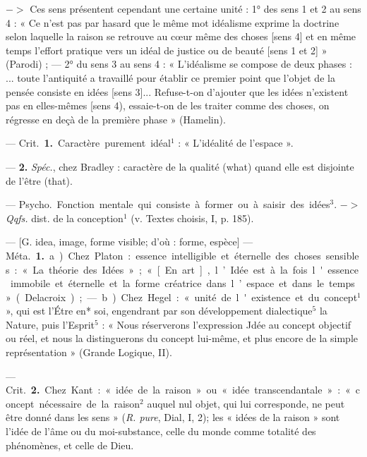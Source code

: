 \begin{itemize}[leftmargin=1cm, label=, itemsep=1pt]
$->$ Ces sens présentent cependant une certaine unité : 1° des
sens 1 et 2 au sens 4 : « Ce n’est pas
par hasard que le même mot idéalisme exprime la doctrine selon laquelle la raison se retrouve au cœur
même des choses [sens 4] et en même
temps l'effort pratique vers un idéal
de justice ou de beauté [sens 1 et 2] »
(Parodi) ; — 2° du sens 3 au sens 4 :
« L’idéalisme se compose de deux
phases : ... toute l'antiquité a travaillé pour établir ce premier point
que l’objet de la pensée consiste en
idées [sens 3]... Refuse-t-on d’ajouter que les idées n'existent pas en
elles-mêmes [sens 4), essaie-t-on
de les traiter comme des choses, on
régresse en deçà de la première
phase » (Hamelin).

 — \si{Crit.} {\bf 1.} Caractère purement idéal$^1$ : « L’idéalité de l’espace ».

— {\bf 2.} {\it Spéc.}, chez Bradley : caractère
de la qualité (what) quand elle est
disjointe de l'être (that).

 — \si{Psycho.} Fonction mentale
qui consiste à former ou à saisir des
idées$^3$. $->$ {\it Qqfs.} dist. de la conception$^1$ (v. Textes choisis, I, p. 185).

 — [G. idea, image, forme visible;
d'où : forme, espèce] — \si{Méta.} {\bf 1.}
a) Chez Platon : essence intelligible
et éternelle des choses sensibles :
« La théorie des Idées »; « [En art],
l’Idée est à la fois l'essence immobile
et éternelle et la forme créatrice
dans l’espace et dans le temps » (Delacroix); — b) Chez Hegel : « unité
de l'existence et du concept$^1$ », qui
est l’Étre en* soi, engendrant par
son développement dialectique$^5$ la
Nature, puis l'Esprit$^5$ : « Nous
réserverons l'expression Jdée au
concept objectif ou réel, et nous la
distinguerons du concept lui-même,
et plus encore de la simple représentation » (Grande Logique, II).

— \si{Crit.} {\bf 2.} Chez Kant : « idée de la
raison » ou « idée transcendantale » :
« concept nécessaire de la raison$^2$
auquel nul objet, qui lui corresponde, ne peut être donné dans les
sens » ({\it R. pure}, Dial, I, 2); les
« idées de la raison » sont l'idée de
l’âme ou du moi-substance, celle du
monde comme totalité des phénomènes, et celle de Dieu.


\end{itemize}
